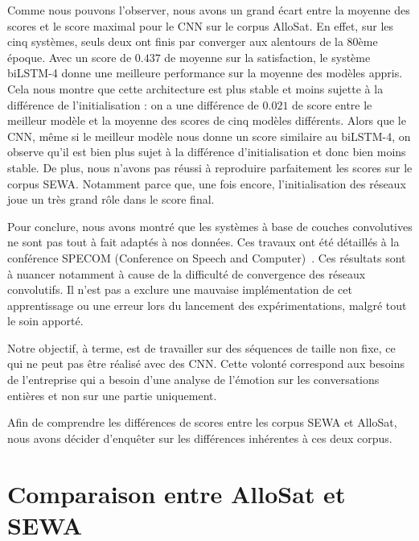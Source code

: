 

Comme nous pouvons l'observer, nous avons un grand écart entre la moyenne des scores et le score maximal pour le CNN sur le corpus AlloSat. En effet, sur les cinq systèmes, seuls deux ont finis par converger aux alentours de la 80ème époque. Avec un score de $0.437$ de moyenne sur la satisfaction, le système biLSTM-4 donne une meilleure performance sur la moyenne des modèles appris. Cela nous montre que cette architecture est plus stable et moins sujette à la différence de l'initialisation : on a une différence de $0.021$ de score entre le meilleur modèle et la moyenne des scores de cinq modèles différents. Alors que le CNN, même si le meilleur modèle nous donne un score similaire au biLSTM-4, on observe qu'il est bien plus sujet à la différence d'initialisation et donc bien moins stable. De plus, nous n'avons pas réussi à reproduire parfaitement les scores sur le corpus SEWA. Notamment parce que, une fois encore, l'initialisation des réseaux joue un très grand rôle dans le score final.

Pour conclure, nous avons montré que les systèmes à base de couches convolutives ne sont pas tout à fait adaptés à nos données. Ces travaux ont été détaillés à la conférence SPECOM (Conference on Speech and Computer)~\cite{Macary2020convorrec}. Ces résultats sont à nuancer notamment à cause de la difficulté de convergence des réseaux convolutifs. Il n'est pas a exclure une mauvaise implémentation de cet apprentissage ou une erreur lors du lancement des expérimentations, malgré tout le soin apporté.

Notre objectif, à terme, est de travailler sur des séquences de taille non fixe, ce qui ne peut pas être réalisé avec des CNN. Cette volonté correspond aux besoins de l'entreprise qui a besoin d'une analyse de l'émotion sur les conversations entières et non sur une partie uniquement.

Afin de comprendre les différences de scores entre les corpus SEWA et AlloSat, nous avons décider d'enquêter sur les différences inhérentes à ces deux corpus.

\section{Comparaison entre AlloSat et SEWA}

